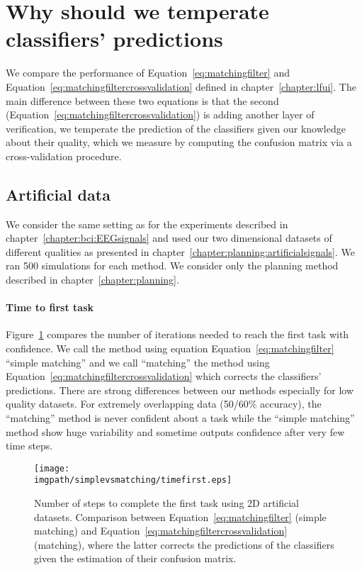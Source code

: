 
\section{Why should we temperate classifiers' predictions}
\label{chapter:limitiations:simplevsmatching}

We compare the performance of Equation~\ref{eq:matchingfilter} and Equation~\ref{eq:matchingfiltercrossvalidation} defined in chapter~\ref{chapter:lfui}. The main difference between these two equations is that the second (Equation~\ref{eq:matchingfiltercrossvalidation}) is adding another layer of verification, we temperate the prediction of the classifiers given our knowledge about their quality, which we measure by computing the confusion matrix via a cross-validation procedure.

\subsection{Artificial data}

We consider the same setting as for the experiments described in chapter~\ref{chapter:bci:EEGsignals} and used our two dimensional datasets of different qualities as presented in chapter~\ref{chapter:planning:artificialsignals}. We ran 500 simulations for each method. We consider only the planning method described in chapter~\ref{chapter:planning}.

\paragraph{Time to first task}  Figure~\ref{fig:timefirst_simplevsmatching} compares the number of iterations needed to reach the first task with confidence. We call the method using equation Equation~\ref{eq:matchingfilter} ``simple matching'' and we call ``matching'' the method using Equation~\ref{eq:matchingfiltercrossvalidation} which corrects the classifiers' predictions. There are strong differences between our methods especially for low quality datasets. For extremely overlapping data (50/60\% accuracy), the ``matching'' method is never confident about a task while the ``simple matching'' method show huge variability and sometime outputs confidence after very few time steps. 

\begin{figure}[!htbp]
\centering
\texttt{[image: \\imgpath/simplevsmatching/timefirst.eps]}
\caption{Number of steps to complete the first task using 2D artificial datasets. Comparison between Equation~\ref{eq:matchingfilter} (simple matching) and Equation~\ref{eq:matchingfiltercrossvalidation} (matching), where the latter corrects the predictions of the classifiers given the estimation of their confusion matrix.}
\label{fig:timefirst_simplevsmatching}
\end{figure} 

